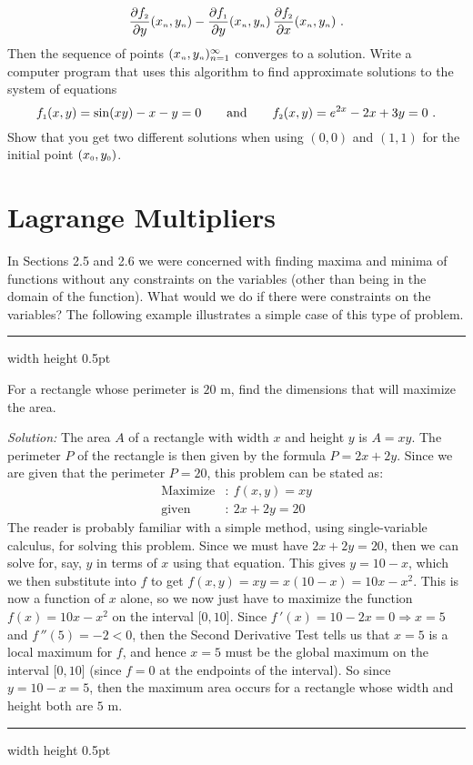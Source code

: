 \begin{enumerate}[\bfseries 1.]
\begin{gather*}
    \frac{\partial f_{\scriptscriptstyle 2}}{\partial y}(x_{\scriptscriptstyle n},y_{\scriptscriptstyle n}) -
    \frac{\partial f_{\scriptscriptstyle 1}}{\partial y}(x_{\scriptscriptstyle n},y_{\scriptscriptstyle n})\,
    \frac{\partial f_{\scriptscriptstyle 2}}{\partial x}(x_{\scriptscriptstyle n},y_{\scriptscriptstyle n}) ~.
  \end{gather*}
  Then the sequence of points $(x_{\scriptscriptstyle n},y_{\scriptscriptstyle n})_{n=1}^{\infty}$ converges to a solution. Write a computer
  program that uses this algorithm to find approximate solutions to the system of equations
  \begin{displaymath}
   f_{\scriptscriptstyle 1}(x,y) = \sin(xy)-x-y=0 \qquad\text{and}\qquad f_{\scriptscriptstyle 2}(x,y) = e^{2x}-2x+3y=0 ~.
  \end{displaymath}
  Show that you get two different solutions when using $(0,0)$ and $(1,1)$ for the initial point
  $(x_{\scriptscriptstyle 0},y_{\scriptscriptstyle 0})$.
\end{enumerate}
\newpage
\section{Lagrange Multipliers}
In Sections 2.5 and 2.6 we were concerned with finding maxima and minima of functions without any constraints on
the variables (other than being in the domain of the function). What would we do if there were constraints on the
variables? The following example illustrates a simple case of this type of problem.

\medskip
\hrule width \textwidth height 0.5pt
\begin{exmp}\label{exmp:consimple}
 For a rectangle whose perimeter is $20$ m, find the dimensions that will maximize the area.\smallskip
 \par\noindent \emph{Solution:} The area $A$ of a rectangle with width $x$ and height $y$ is $A = xy$. The perimeter $P$
 of the rectangle is then given by the formula $P = 2x + 2y$. Since we are given that the perimeter $P = 20$, this
 problem can be stated as:
 \begin{align*}
  \text{Maximize}&: ~ f(x,y) = xy\\
  \text{given}&: ~ 2x + 2y = 20
 \end{align*}
 The reader is probably familiar with a simple method, using single-variable calculus, for solving this problem. Since
 we must have $2x+2y=20$, then we can solve for, say, $y$ in terms of $x$ using that equation. This gives $y = 10 - x$,
 which we then substitute into $f$ to get $f(x,y) = xy = x(10-x) = 10x - x^2$. 
 This is now a function of $x$ alone, so
 we now just have to maximize the function $f(x) = 10x - x^2$ on the interval $\lbrack 0, 10 \rbrack$. Since
 $f\,'(x) = 10-2x = 0 \Rightarrow x =5$ and $f\,''(5) = -2 < 0$, then the Second Derivative Test tells us that $x=5$ is
 a local maximum for $f$, and hence $x=5$ must be the global maximum on the interval $\lbrack 0, 10 \rbrack$ (since
 $f = 0$ at the endpoints of the interval). 
 So since $y=10-x =5$, then the maximum area occurs for a rectangle whose
 width and height both are $5$ m.
\end{exmp}
\hrule width \textwidth height 0.5pt
\medskip


